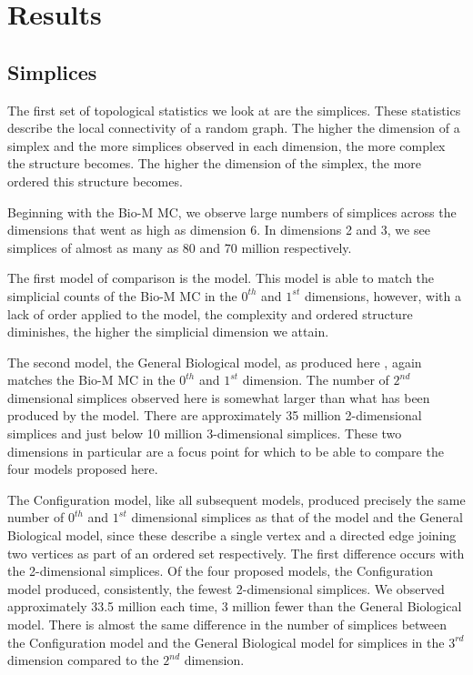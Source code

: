 \section{Results}
\subsection{Simplices}
The first set of topological statistics we look at are the simplices. These statistics describe the local connectivity of a random graph. The higher the dimension of a simplex and the more simplices observed in each dimension, the more complex the structure becomes. The higher the dimension of the simplex, the more ordered this structure becomes.

Beginning with the Bio-M MC, we observe large numbers of simplices across the dimensions that went as high as dimension 6. In dimensions 2 and 3, we see simplices of almost as many as 80 and 70 million respectively.

The first model of comparison is the \ER model. This model is able to match the simplicial counts of the Bio-M MC in the $0^{th}$ and $1^{st}$ dimensions, however, with a lack of order applied to the model, the complexity and ordered structure diminishes, the higher the simplicial dimension we attain.

The second model, the General Biological model, as produced here \cite{Reimann_2017}, again matches the Bio-M MC in the $0^{th}$ and $1^{st}$ dimension. The number of $2^{nd}$ dimensional simplices observed here is somewhat larger than what has been produced by the \ER model. There are approximately 35 million 2-dimensional simplices and just below 10 million 3-dimensional simplices. These two dimensions in particular are a focus point for which to be able to compare the four models proposed here.

The Configuration model, like all subsequent models, produced precisely the same number of $0^{th}$ and $1^{st}$ dimensional simplices as that of the \ER model and the General Biological model, since these describe a single vertex and a directed edge joining two vertices as part of an ordered set respectively. The first difference occurs with the 2-dimensional simplices. Of the four proposed models, the Configuration model produced, consistently, the fewest 2-dimensional simplices. We observed approximately 33.5 million each time, 3 million fewer than the General Biological model. There is almost the same difference in the number of simplices between the Configuration model and the General Biological model for simplices in the $3^{rd}$ dimension compared to the $2^{nd}$ dimension.

